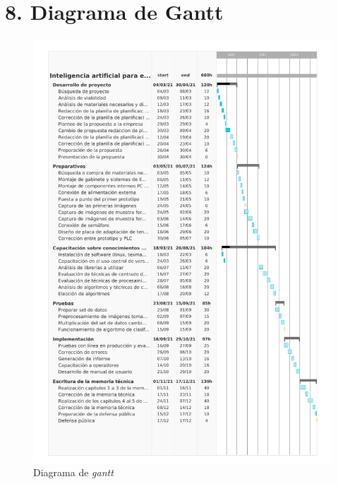 \documentclass[11pt]{charter}
\begin{document}
\section{8. Diagrama de Gantt}
\label{sec:gantt}

\begin{figure}[ht]
\centering 
\includegraphics[origin=c,width=\textwidth]{./Figuras/Gantt7.pdf} %
\caption{Diagrama de \textit{gantt }}
\label{fig:gantt}
\end{figure}




\end{document}
